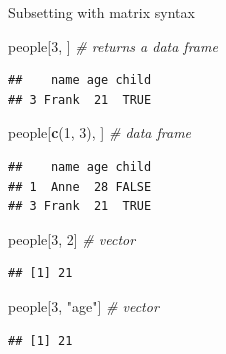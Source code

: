 \documentclass[ignorenonframetext,]{beamer}
\newenvironment{Shaded}{\begin{snugshade}}{\end{snugshade}}
\newcommand{\CommentTok}[1]{\textcolor[rgb]{0.56,0.35,0.01}{\textit{#1}}}
\newcommand{\DecValTok}[1]{\textcolor[rgb]{0.00,0.00,0.81}{#1}}
\newcommand{\KeywordTok}[1]{\textcolor[rgb]{0.13,0.29,0.53}{\textbf{#1}}}
\newcommand{\NormalTok}[1]{#1}
\newcommand{\StringTok}[1]{\textcolor[rgb]{0.31,0.60,0.02}{#1}}
\begin{document}
\begin{frame}[fragile]{Subsetting with matrix syntax}
\protect\hypertarget{subsetting-with-matrix-syntax}{}

\begin{Shaded}
\begin{Highlighting}[]
\NormalTok{people[}\DecValTok{3}\NormalTok{, ] }\CommentTok{# returns a data frame}
\end{Highlighting}
\end{Shaded}

\begin{verbatim}
##    name age child
## 3 Frank  21  TRUE
\end{verbatim}

\begin{Shaded}
\begin{Highlighting}[]
\NormalTok{people[}\KeywordTok{c}\NormalTok{(}\DecValTok{1}\NormalTok{, }\DecValTok{3}\NormalTok{), ] }\CommentTok{# data frame}
\end{Highlighting}
\end{Shaded}

\begin{verbatim}
##    name age child
## 1  Anne  28 FALSE
## 3 Frank  21  TRUE
\end{verbatim}

\begin{Shaded}
\begin{Highlighting}[]
\NormalTok{people[}\DecValTok{3}\NormalTok{, }\DecValTok{2}\NormalTok{] }\CommentTok{# vector}
\end{Highlighting}
\end{Shaded}

\begin{verbatim}
## [1] 21
\end{verbatim}

\begin{Shaded}
\begin{Highlighting}[]
\NormalTok{people[}\DecValTok{3}\NormalTok{, }\StringTok{"age"}\NormalTok{] }\CommentTok{# vector}
\end{Highlighting}
\end{Shaded}

\begin{verbatim}
## [1] 21
\end{verbatim}

\end{frame}
\end{document}
